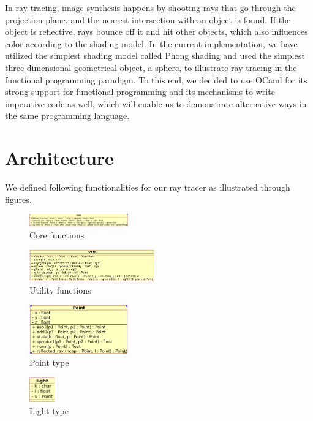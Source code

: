 \documentclass[conference]{IEEEtran}
\begin{document}
In ray tracing, image synthesis happens by shooting rays that go through the projection plane, and the nearest intersection with an object is found. If the object is reflective, rays bounce off it and hit other objects, which also influences color according to the shading model\cite{kevin}. In the current implementation\cite{mycode}, we have utilized the simplest shading model called Phong shading\cite{peter} and used the simplest three-dimensional geometrical object, a sphere, to illustrate ray tracing in the functional programming paradigm. To this end, we decided to use OCaml for its strong support for functional programming and its mechanisms to write imperative code as well, which will enable us to demonstrate alternative ways in the same programming language.

\section{Architecture}
We defined following functionalities for our ray tracer as illustrated through figures.

\begin{figure}[htbp]
  \centerline{\includegraphics[width=0.38\textwidth]{./figs/corediagram.png}}
  \caption{Core functions}
\end{figure}

\begin{figure}[htbp]
  \centerline{\includegraphics[width=0.48\textwidth]{./figs/utilsdiagram.png}}
  \caption{Utility functions}
\end{figure}

\begin{figure}[htbp]
  \centerline{\includegraphics[width=0.38\textwidth]{./figs/pointdiagram.png}}
  \caption{Point type}
\end{figure}

\begin{figure}[htbp]
  \centerline{\includegraphics[width=0.1\textwidth]{./figs/lightdigram.png}}
  \caption{Light type}
\end{figure}
\end{document}
